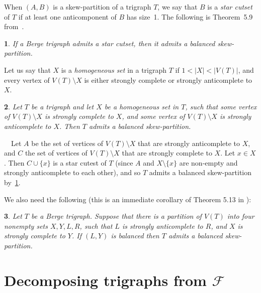 \documentclass[11 pt] {article}
\newcommand\blackslug{\hbox{\hskip 1pt \vrule width 4pt height 8pt depth 1.5pt
        \hskip 1pt}}
\newcommand\bbox{\hfill \quad \blackslug \medbreak}
\newtheorem{theorem}{}[section]
\newcounter{claim}
\newcommand{\Proof}{\setcounter{claim}{0}\noindent{\bf Proof.}\ \ }
\begin{document}
When $(A, B)$ is a skew-partition of a trigraph $T$, we say that $B$ is
a \emph{star cutset} of $T$ if at least one anticomponent of $B$ has size~1.
The following is Theorem~5.9 from~\cite{thesis}.

\begin{theorem}
 \label{starcutset}
 If a Berge trigraph admits a star cutset, then it admits a balanced
 skew-partition.
\end{theorem}


Let us say that $X$ is a \emph{homogeneous set} in
a trigraph $T$ if $1<|X|<|V(T)|$, and every vertex of $V(T) \setminus X$ is
either strongly complete or strongly anticomplete to $X$.

\begin{theorem}
\label{lemma}
Let $T$ be a trigraph and let $X$ be a homogeneous set in $T$, 
such that some vertex of $V(T) \setminus X$ is strongly complete to $X$, and
some vertex of $V(T) \setminus X$ is strongly anticomplete to $X$. Then
$T$ admits a balanced skew-partition.
\end{theorem}

\Proof Let $A$ be the set of vertices of $V(T) \setminus X$ that are 
strongly anticomplete to $X$, and $C$ the set of vertices of 
$V(T) \setminus X$ that are strongly complete to $X$. Let $x \in X$. Then 
$C \cup \{x\}$ is a star cutest of $T$ (since $A$ and $X \setminus \{x\}$ 
are non-empty and strongly anticomplete to each other), and so $T$ 
admits a balanced skew-partition by~\ref{starcutset}. \bbox


We also need the following (this is an immediate corollary of Theorem 5.13 in 
\cite{thesis}):
\begin{theorem}
\label{onepair}
Let $T$ be a Berge trigraph.
Suppose that there is a partition of $V(T)$ into four nonempty sets 
$X,Y,L,R$, such that $L$ is strongly anticomplete to $R$, and $X$
is strongly complete to $Y$. If $(L,Y)$ is balanced then $T$ admits a balanced 
skew-partition.
\end{theorem}




\section{Decomposing trigraphs from $\mathcal F$}
\label{sec:blocks}
\end{document}
